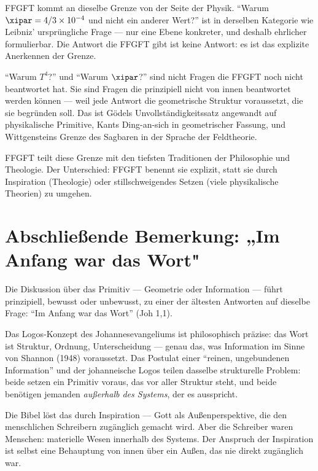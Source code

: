 FFGFT kommt an dieselbe Grenze von der Seite der Physik. ``Warum $\xipar = 4/3 \times 10^{-4}$ und nicht ein anderer Wert?'' ist in derselben Kategorie wie Leibniz' ursprüngliche Frage --- nur eine Ebene konkreter, und deshalb ehrlicher formulierbar. Die Antwort die FFGFT gibt ist keine Antwort: es ist das explizite Anerkennen der Grenze.

\begin{erkenntnis}
``Warum $T^4$?'' und ``Warum $\xipar$?'' sind nicht Fragen die FFGFT noch nicht beantwortet hat. Sie sind Fragen die prinzipiell nicht von innen beantwortet werden können --- weil jede Antwort die geometrische Struktur voraussetzt, die sie begründen soll. Das ist Gödels Unvollständigkeitssatz angewandt auf physikalische Primitive, Kants Ding-an-sich in geometrischer Fassung, und Wittgensteins Grenze des Sagbaren in der Sprache der Feldtheorie.

FFGFT teilt diese Grenze mit den tiefsten Traditionen der Philosophie und Theologie. Der Unterschied: FFGFT benennt sie explizit, statt sie durch Inspiration (Theologie) oder stillschweigendes Setzen (viele physikalische Theorien) zu umgehen.
\end{erkenntnis}

\section*{Abschließende Bemerkung: „Im Anfang war das Wort"}

Die Diskussion über das Primitiv --- Geometrie oder Information --- führt prinzipiell, bewusst oder unbewusst, zu einer der ältesten Antworten auf dieselbe Frage: ``Im Anfang war das Wort'' (Joh 1,1).

Das Logos-Konzept des Johannesevangeliums ist philosophisch präzise: das Wort ist Struktur, Ordnung, Unterscheidung --- genau das, was Information im Sinne von Shannon (1948) voraussetzt. Das Postulat einer ``reinen, ungebundenen Information'' und der johanneische Logos teilen dasselbe strukturelle Problem: beide setzen ein Primitiv voraus, das vor aller Struktur steht, und beide benötigen jemanden \emph{außerhalb des Systems}, der es ausspricht.

Die Bibel löst das durch Inspiration --- Gott als Außenperspektive, die den menschlichen Schreibern zugänglich gemacht wird. Aber die Schreiber waren Menschen: materielle Wesen innerhalb des Systems. Der Anspruch der Inspiration ist selbst eine Behauptung von innen über ein Außen, das nie direkt zugänglich war.

